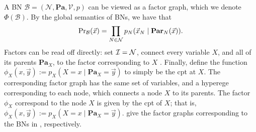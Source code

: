 \documentclass{article}
\newcommand{\V}{\mathcal V}
\newcommand{\N}{\mathcal N}
\newcommand\Pa{\mathbf{Pa}}
\numberwithin{equation}{section}
\begin{document}
A BN $\mathcal B = (\N, \Pa, \V, p)$ can be viewed
as a factor graph, which we denote $\Phi(\mathcal B)$.
By the global semantics of BNs, we have that
	\begin{align*}
	  {\Pr}_{\cal B}(\vec x) = \prod_{N \in \N} p_N( \vec x_N
         \mid \mathbf{Par}_N(\vec x)). 
	\end{align*} 
%
Factors can be read off directly: set $\cal I = \N$, connect every
variable $X$, and all of its parents $\Pa_X$, to the factor
corresponding to $X$%
. Finally,
define the function $\phi_X(x, \vec{y}) := p_X( X \!\!=\!\! x \mid
\Pa_X \!\!=\!\! \vec y)$ to simply be the cpt at $X$.
%
The corresponding factor graph has the same set of variables, and a
hyperege corresponding to each node, which connects a node $X$ to its
parents.
The factor $\phi_X$ correspond to the node $X$ is given by the cpt of
$X$; that is, $\phi_X(x,
\vec{y}) := p_X( X \!\!=\!\! x \mid 
\Pa_X \!\!=\!\! \vec y)$.
%
 give the factor graphs corresponding  to
the BNs in , respectively.  
	
\end{document}
